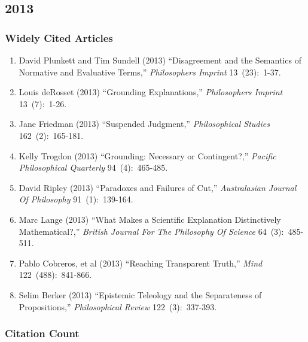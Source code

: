 \documentclass[
  10pt,
  letterpaper,
  DIV=11,
  numbers=noendperiod,
  twoside]{scrartcl}
\providecommand{\tightlist}{%
  \setlength{\itemsep}{0pt}\setlength{\parskip}{0pt}}\usepackage{longtable,booktabs,array}
\begin{document}
\newpage

\subsection{2013}\label{sec-s2013}

\subsubsection*{Widely Cited Articles}\label{widely-cited-articles-56}

\begin{enumerate}
\def\labelenumi{\arabic{enumi}.}
\tightlist
\item
  David Plunkett and Tim Sundell (2013) ``Disagreement and the Semantics
  of Normative and Evaluative Terms,'' \emph{Philosophers Imprint}
  13~(23):~1-37.
\item
  Louis deRosset (2013) ``Grounding Explanations,'' \emph{Philosophers
  Imprint} 13~(7):~1-26.
\item
  Jane Friedman (2013) ``Suspended Judgment,'' \emph{Philosophical
  Studies} 162~(2):~165-181.
\item
  Kelly Trogdon (2013) ``Grounding: Necessary or Contingent?,''
  \emph{Pacific Philosophical Quarterly} 94~(4):~465-485.
\item
  David Ripley (2013) ``Paradoxes and Failures of Cut,''
  \emph{Australasian Journal Of Philosophy} 91~(1):~139-164.
\item
  Marc Lange (2013) ``What Makes a Scientific Explanation Distinctively
  Mathematical?,'' \emph{British Journal For The Philosophy Of Science}
  64~(3):~485-511.
\item
  Pablo Cobreros, et al (2013) ``Reaching Transparent Truth,''
  \emph{Mind} 122~(488):~841-866.
\item
  Selim Berker (2013) ``Epistemic Teleology and the Separateness of
  Propositions,'' \emph{Philosophical Review} 122~(3):~337-393.
\end{enumerate}

\subsubsection*{Citation Count}\label{sec-count-2013}
\end{document}
